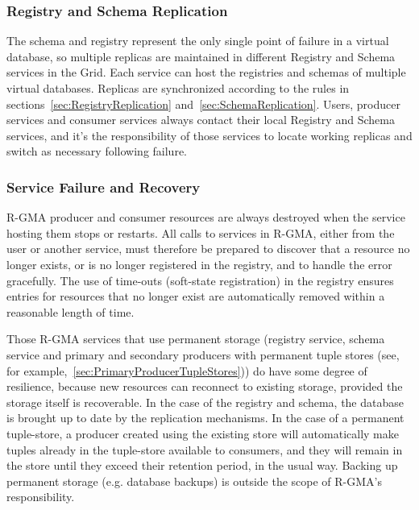 \subsubsection{Registry and Schema Replication}

The schema and registry represent the only single point of 
failure in a virtual database, so multiple replicas are maintained in different 
Registry and Schema services in the Grid. Each service can host the registries 
and schemas of multiple virtual databases. Replicas are synchronized according 
to the rules in sections~\ref{sec:RegistryReplication} 
and~\ref{sec:SchemaReplication}. Users, producer services and consumer services 
always contact their local Registry and Schema services, and it's the 
responsibility of those services to locate working replicas and switch as 
necessary following failure.

\subsubsection{Service Failure and Recovery}

R-GMA producer and consumer resources are always destroyed when the
service hosting them stops or restarts. All calls to services in R-GMA, either
from the user or another service, must therefore be prepared to
discover that a resource no longer exists, or is no longer registered in the
registry, and to handle the error gracefully. The use of time-outs (soft-state
registration) in the registry ensures entries
for resources that no longer exist are automatically removed within a
reasonable length of time.

Those R-GMA services that use permanent storage (registry service,
schema service and primary and secondary producers with permanent
tuple stores (see, for example,~\ref{sec:PrimaryProducerTupleStores})) do have
some degree of resilience, because new resources
can reconnect to existing storage, provided the storage itself is
recoverable.  In the case of the registry and schema, the database is
brought up to date by the replication mechanisms. In the case of a permanent
tuple-store, a producer created using the existing store will automatically
make tuples already in the tuple-store available to consumers, and they
will remain in the store until they exceed their retention period, in
the usual way. Backing up permanent storage (e.g. database backups)
is outside the scope of R-GMA's responsibility.


